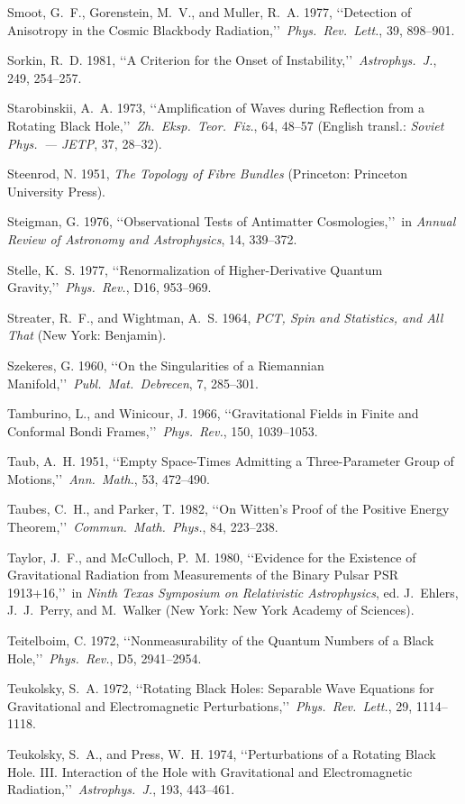 \item Smoot, G.~F., Gorenstein, M.~V., and Muller, R.~A. 1977, \lq\lq Detection of Anisotropy in the Cosmic Blackbody Radiation,\rq\rq\ \emph{Phys.\ Rev.\ Lett.}, 39, 898--901.
\item Sorkin, R.~D. 1981, \lq\lq A Criterion for the Onset of Instability,\rq\rq\ \emph{Astrophys.\ J.}, 249, 254--257.
\item Starobinskii, A.~A. 1973, \lq\lq Amplification of Waves during Reflection from a Rotating Black Hole,\rq\rq\ \emph{Zh.\ Eksp.\ Teor.\ Fiz.}, 64, 48--57 (English transl.: \emph{Soviet Phys.\ --- JETP}, 37, 28--32).
\item Steenrod, N. 1951, \emph{The Topology of Fibre Bundles} (Princeton: Princeton University Press).
\item Steigman, G. 1976, \lq\lq Observational Tests of Antimatter Cosmologies,\rq\rq\ in \emph{Annual Review of Astronomy and Astrophysics}, 14, 339--372.
\item Stelle, K.~S. 1977, \lq\lq Renormalization of Higher-Derivative Quantum Gravity,\rq\rq\ \emph{Phys.\ Rev.}, D16, 953--969.
\item Streater, R.~F., and Wightman, A.~S. 1964, \emph{PCT, Spin and Statistics, and All That} (New York: Benjamin).
\item Szekeres, G. 1960, \lq\lq On the Singularities of a Riemannian Manifold,\rq\rq\ \emph{Publ.\ Mat.\ Debrecen}, 7, 285--301.
\item Tamburino, L., and Winicour, J. 1966, \lq\lq Gravitational Fields in Finite and Conformal Bondi Frames,\rq\rq\ \emph{Phys.\ Rev.}, 150, 1039--1053.
\item Taub, A.~H. 1951, \lq\lq Empty Space-Times Admitting a Three-Parameter Group of Motions,\rq\rq\ \emph{Ann.\ Math.}, 53, 472--490.
\item Taubes, C.~H., and Parker, T. 1982, \lq\lq On Witten's Proof of the Positive Energy Theorem,\rq\rq\ \emph{Commun.\ Math.\ Phys.}, 84, 223--238.
\item Taylor, J.~F., and McCulloch, P.~M. 1980, \lq\lq Evidence for the Existence of Gravitational Radiation from Measurements of the Binary Pulsar PSR 1913+16,\rq\rq\ in \emph{Ninth Texas Symposium on Relativistic Astrophysics}, ed. J.~Ehlers, J.~J.~Perry, and M.~Walker (New York: New York Academy of Sciences).
\item Teitelboim, C. 1972, \lq\lq Nonmeasurability of the Quantum Numbers of a Black Hole,\rq\rq\ \emph{Phys.\ Rev.}, D5, 2941--2954.
\item Teukolsky, S.~A. 1972, \lq\lq Rotating Black Holes: Separable Wave Equations for Gravitational and Electromagnetic Perturbations,\rq\rq\ \emph{Phys.\ Rev.\ Lett.}, 29, 1114--1118.
\item Teukolsky, S.~A., and Press, W.~H. 1974, \lq\lq Perturbations of a Rotating Black Hole. III. Interaction of the Hole with Gravitational and Electromagnetic Radiation,\rq\rq\ \emph{Astrophys.\ J.}, 193, 443--461.

